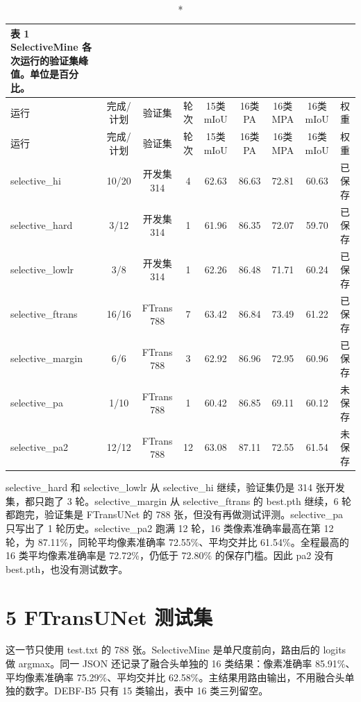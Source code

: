 \documentclass[11pt]{article}
\begin{document}
{\footnotesize\setlength{\tabcolsep}{3pt}
\begin{longtable}{lcccccccc}
\caption*{表 1  SelectiveMine 各次运行的验证集峰值。单位是百分比。}\\
\toprule
运行 & 完成/计划 & 验证集 & 轮次 & 15类 mIoU & 16类 PA & 16类 MPA & 16类 mIoU & 权重\\
\midrule
\endfirsthead
\toprule
运行 & 完成/计划 & 验证集 & 轮次 & 15类 mIoU & 16类 PA & 16类 MPA & 16类 mIoU & 权重\\
\midrule
\endhead
selective\_hi & 10/20 & 开发集 314 & 4 & 62.63 & 86.63 & 72.81 & 60.63 & 已保存\\
selective\_hard & 3/12 & 开发集 314 & 1 & 61.96 & 86.35 & 72.07 & 59.70 & 已保存\\
selective\_lowlr & 3/8 & 开发集 314 & 1 & 62.26 & 86.48 & 71.71 & 60.24 & 已保存\\
selective\_ftrans & 16/16 & FTrans 788 & 7 & 63.42 & 86.84 & 73.49 & 61.22 & 已保存\\
selective\_margin & 6/6 & FTrans 788 & 3 & 62.92 & 86.96 & 72.95 & 60.96 & 已保存\\
selective\_pa & 1/10 & FTrans 788 & 1 & 60.42 & 86.85 & 69.11 & 60.12 & 未保存\\
selective\_pa2 & 12/12 & FTrans 788 & 12 & 63.08 & 87.11 & 72.55 & 61.54 & 未保存\\
\bottomrule
\end{longtable}
}
selective\_hard 和 selective\_lowlr 从 selective\_hi 继续，验证集仍是 314 张开发集，都只跑了 3 轮。selective\_margin 从 selective\_ftrans 的 best.pth 继续，6 轮都跑完，验证集是 FTransUNet 的 788 张，但没有再做测试评测。selective\_pa 只写出了 1 轮历史。selective\_pa2 跑满 12 轮，16 类像素准确率最高在第 12 轮，为 87.11\%，同轮平均像素准确率 72.55\%、平均交并比 61.54\%。全程最高的 16 类平均像素准确率是 72.72\%，仍低于 72.80\% 的保存门槛。因此 pa2 没有 best.pth，也没有测试数字。

\section*{5  FTransUNet 测试集}
这一节只使用 test.txt 的 788 张。SelectiveMine 是单尺度前向，路由后的 logits 做 argmax。同一 JSON 还记录了融合头单独的 16 类结果：像素准确率 85.91\%、平均像素准确率 75.29\%、平均交并比 62.58\%。主结果用路由输出，不用融合头单独的数字。DEBF-B5 只有 15 类输出，表中 16 类三列留空。
\end{document}
